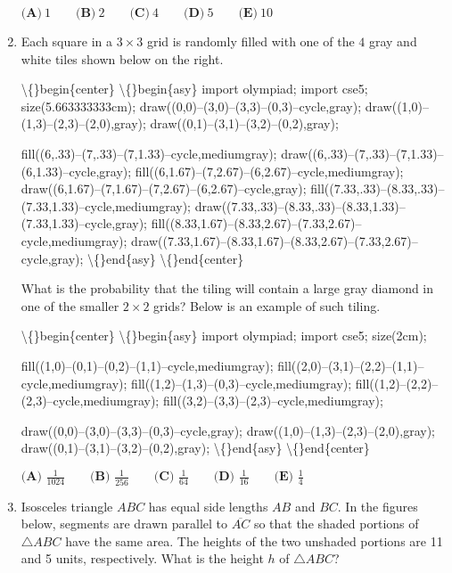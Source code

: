 \documentclass{article}
\begin{document}
\begin{enumerate}[label=\arabic*., itemsep=0.5em]
\(\textbf{(A)}\ 1 \qquad \textbf{(B)}\ 2 \qquad \textbf{(C)}\ 4 \qquad \textbf{(D)}\ 5 \qquad \textbf{(E)}\ 10\)\par \vspace{0.5em}\item Each square in a \(3 \times 3\) grid is randomly filled with one of the \(4\) gray and white tiles shown below on the right. 

\textbackslash\{\}begin\{center\}
\textbackslash\{\}begin\{asy\}
import olympiad;
import cse5;
size(5.663333333cm);
draw((0,0)--(3,0)--(3,3)--(0,3)--cycle,gray);
draw((1,0)--(1,3)--(2,3)--(2,0),gray);
draw((0,1)--(3,1)--(3,2)--(0,2),gray);

fill((6,.33)--(7,.33)--(7,1.33)--cycle,mediumgray);
draw((6,.33)--(7,.33)--(7,1.33)--(6,1.33)--cycle,gray);
fill((6,1.67)--(7,2.67)--(6,2.67)--cycle,mediumgray);
draw((6,1.67)--(7,1.67)--(7,2.67)--(6,2.67)--cycle,gray);
fill((7.33,.33)--(8.33,.33)--(7.33,1.33)--cycle,mediumgray);
draw((7.33,.33)--(8.33,.33)--(8.33,1.33)--(7.33,1.33)--cycle,gray);
fill((8.33,1.67)--(8.33,2.67)--(7.33,2.67)--cycle,mediumgray);
draw((7.33,1.67)--(8.33,1.67)--(8.33,2.67)--(7.33,2.67)--cycle,gray);
\textbackslash\{\}end\{asy\}
\textbackslash\{\}end\{center\}

What is the probability that the tiling will contain a large gray diamond in one of the smaller \(2 \times 2\) grids? Below is an example of such tiling. 

\textbackslash\{\}begin\{center\}
\textbackslash\{\}begin\{asy\}
import olympiad;
import cse5;
size(2cm);

fill((1,0)--(0,1)--(0,2)--(1,1)--cycle,mediumgray);
fill((2,0)--(3,1)--(2,2)--(1,1)--cycle,mediumgray);
fill((1,2)--(1,3)--(0,3)--cycle,mediumgray);
fill((1,2)--(2,2)--(2,3)--cycle,mediumgray);
fill((3,2)--(3,3)--(2,3)--cycle,mediumgray);

draw((0,0)--(3,0)--(3,3)--(0,3)--cycle,gray);
draw((1,0)--(1,3)--(2,3)--(2,0),gray);
draw((0,1)--(3,1)--(3,2)--(0,2),gray);
\textbackslash\{\}end\{asy\}
\textbackslash\{\}end\{center\}


\(\textbf{(A) } \frac{1}{1024} \qquad \textbf{(B) } \frac{1}{256} \qquad \textbf{(C) } \frac{1}{64} \qquad \textbf{(D) } \frac{1}{16} \qquad \textbf{(E) } \frac{1}{4}\)\par \vspace{0.5em}\item Isosceles triangle \(ABC\) has equal side lengths \(AB\) and \(BC\). In the figures below, segments are drawn parallel to \(\overline{AC}\) so that the shaded portions of \(\triangle ABC\) have the same area. The heights of the two unshaded portions are 11 and 5 units, respectively. What is the height \(h\) of \(\triangle ABC\)?



\end{enumerate}
\end{document}
